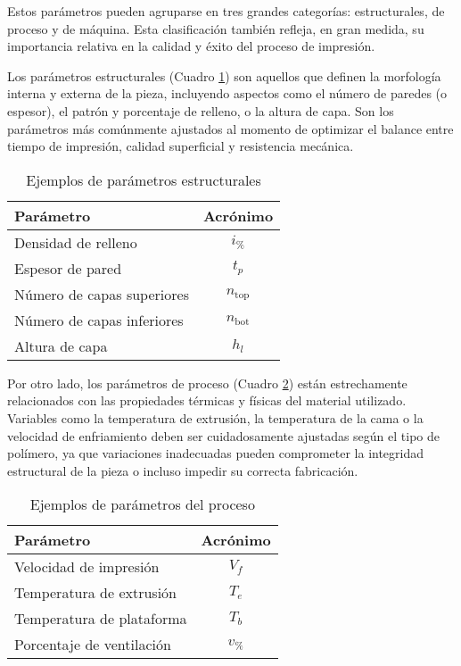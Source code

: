 Estos parámetros pueden agruparse en tres grandes categorías: estructurales, de proceso y de máquina. Esta clasificación también refleja, en gran medida, su importancia relativa en la calidad y éxito del proceso de impresión. 

Los parámetros estructurales (Cuadro \ref{tab:param-estructurales}) son aquellos que definen la morfología interna y externa de la pieza, incluyendo aspectos como el número de paredes (o espesor), el patrón y porcentaje de relleno, o la altura de capa. Son los parámetros más comúnmente ajustados al momento de optimizar el balance entre tiempo de impresión, calidad superficial y resistencia mecánica.

\begin{table}[ht]
  \centering
  \caption{Ejemplos de parámetros estructurales}
  \label{tab:param-estructurales}
  \begin{tabular}{@{} l c @{}}
    \toprule
    Parámetro                   & Acrónimo            \\
    \midrule
    Densidad de relleno        & $i_{\%}$          \\
    Espesor de pared            & $t_{p}$             \\
    Número de capas superiores            & $n_{\mathrm{top}}$  \\
    Número de capas inferiores            & $n_{\mathrm{bot}}$  \\
    Altura de capa           & $h_{l}$                  \\
    \bottomrule
  \end{tabular}
\end{table}

Por otro lado, los parámetros de proceso (Cuadro \ref{tab:param-proceso}) están estrechamente relacionados con las propiedades térmicas y físicas del material utilizado. Variables como la temperatura de extrusión, la temperatura de la cama o la velocidad de enfriamiento deben ser cuidadosamente ajustadas según el tipo de polímero, ya que variaciones inadecuadas pueden comprometer la integridad estructural de la pieza o incluso impedir su correcta fabricación.

\begin{table}[ht]
  \centering
  \caption{Ejemplos de parámetros del proceso}
  \label{tab:param-proceso}
  \begin{tabular}{@{} l c @{}}
    \toprule
    Parámetro                         & Acrónimo    \\
    \midrule
    Velocidad de impresión            & $V_{f}$     \\
    Temperatura de extrusión          & $T_{e}$     \\
    Temperatura de plataforma         & $T_{b}$     \\
    Porcentaje de ventilación         & $v_{\%}$ \\
    \bottomrule
  \end{tabular}
\end{table}

